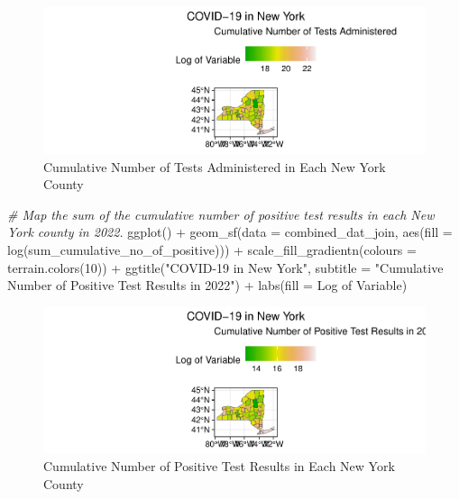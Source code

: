 \documentclass[
  12pt,
]{article}
\newenvironment{Shaded}{\begin{snugshade}}{\end{snugshade}}
\newcommand{\AttributeTok}[1]{\textcolor[rgb]{0.77,0.63,0.00}{#1}}
\newcommand{\CommentTok}[1]{\textcolor[rgb]{0.56,0.35,0.01}{\textit{#1}}}
\newcommand{\DecValTok}[1]{\textcolor[rgb]{0.00,0.00,0.81}{#1}}
\newcommand{\FunctionTok}[1]{\textcolor[rgb]{0.00,0.00,0.00}{#1}}
\newcommand{\NormalTok}[1]{#1}
\newcommand{\SpecialCharTok}[1]{\textcolor[rgb]{0.00,0.00,0.00}{#1}}
\newcommand{\StringTok}[1]{\textcolor[rgb]{0.31,0.60,0.02}{#1}}
\begin{document}
\begin{figure}

\includegraphics{EDA_Final_Group_Project_files/figure-latex/unnamed-chunk-17-1} \hfill{}

\caption{Cumulative Number of Tests Administered in Each New York County}\label{fig:unnamed-chunk-17}
\end{figure}

\begin{Shaded}
\begin{Highlighting}[]
\CommentTok{\# Map the sum of the cumulative number of positive test results in each New York county in 2022.}
\FunctionTok{ggplot}\NormalTok{() }\SpecialCharTok{+}
  \FunctionTok{geom\_sf}\NormalTok{(}\AttributeTok{data =}\NormalTok{ combined\_dat\_join, }\FunctionTok{aes}\NormalTok{(}\AttributeTok{fill =} \FunctionTok{log}\NormalTok{(sum\_cumulative\_no\_of\_positive))) }\SpecialCharTok{+}
  \FunctionTok{scale\_fill\_gradientn}\NormalTok{(}\AttributeTok{colours =} \FunctionTok{terrain.colors}\NormalTok{(}\DecValTok{10}\NormalTok{)) }\SpecialCharTok{+}
  \FunctionTok{ggtitle}\NormalTok{(}\StringTok{"COVID{-}19 in New York"}\NormalTok{,}
          \AttributeTok{subtitle =} \StringTok{"Cumulative Number of Positive Test Results in 2022"}\NormalTok{) }\SpecialCharTok{+}
  \FunctionTok{labs}\NormalTok{(}\AttributeTok{fill =} \StringTok{\textquotesingle{}Log of Variable\textquotesingle{}}\NormalTok{)}
\end{Highlighting}
\end{Shaded}

\begin{figure}

\includegraphics{EDA_Final_Group_Project_files/figure-latex/unnamed-chunk-18-1} \hfill{}

\caption{Cumulative Number of Positive Test Results in Each New York County}\label{fig:unnamed-chunk-18}
\end{figure}
\end{document}
